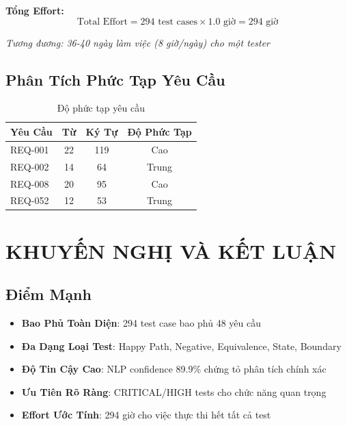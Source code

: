\documentclass[12pt, a4paper]{article}
\begin{document}
\textbf{Tổng Effort:}
\begin{equation}
\text{Total Effort} = 294 \text{ test cases} \times 1.0 \text{ giờ} = 294 \text{ giờ}
\end{equation}

\textit{Tương đương: 36-40 ngày làm việc (8 giờ/ngày) cho một tester}

\subsection{Phân Tích Phức Tạp Yêu Cầu}

\begin{table}[h]
\centering
\begin{tabular}{|l|c|c|c|}
\hline
\textbf{Yêu Cầu} & \textbf{Từ} & \textbf{Ký Tự} & \textbf{Độ Phức Tạp} \\
\hline
REQ-001 & 22 & 119 & Cao \\
REQ-002 & 14 & 64 & Trung \\
REQ-008 & 20 & 95 & Cao \\
REQ-052 & 12 & 53 & Trung \\
\hline
\end{tabular}
\caption{Độ phức tạp yêu cầu}
\end{table}

\newpage

\section{KHUYẾN NGHỊ VÀ KẾT LUẬN}

\subsection{Điểm Mạnh}

\begin{itemize}
    \item \textbf{Bao Phủ Toàn Diện}: 294 test case bao phủ 48 yêu cầu
    \item \textbf{Đa Dạng Loại Test}: Happy Path, Negative, Equivalence, State, Boundary
    \item \textbf{Độ Tin Cậy Cao}: NLP confidence 89.9\% chứng tỏ phân tích chính xác
    \item \textbf{Ưu Tiên Rõ Ràng}: CRITICAL/HIGH tests cho chức năng quan trọng
    \item \textbf{Effort Ước Tính}: 294 giờ cho việc thực thi hết tất cả test
\end{itemize}
\end{document}
